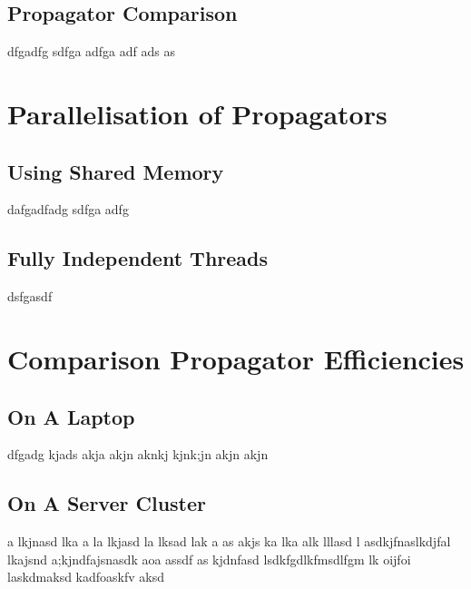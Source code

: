 \subsection{Propagator Comparison}
dfgadfg
sdfga adfga adf ads 
as 

\section{Parallelisation of Propagators}
\subsection{Using Shared Memory}
dafgadfadg sdfga adfg

\subsection{Fully Independent Threads}
dsfgasdf 

\section{Comparison Propagator Efficiencies}
\subsection{On A Laptop}
dfgadg kjads akja akjn aknkj kjnk;jn akjn akjn 

\subsection{On A Server Cluster}
a lkjnasd lka a la lkjasd la lksad lak a
as akjs ka lka alk lllasd l
asdkjfnaslkdjfal lkajsnd a;kjndfajsnasdk aoa 
assdf as kjdnfasd
lsdkfgdlkfmsdlfgm lk oijfoi  laskdmaksd kadfoaskfv aksd

